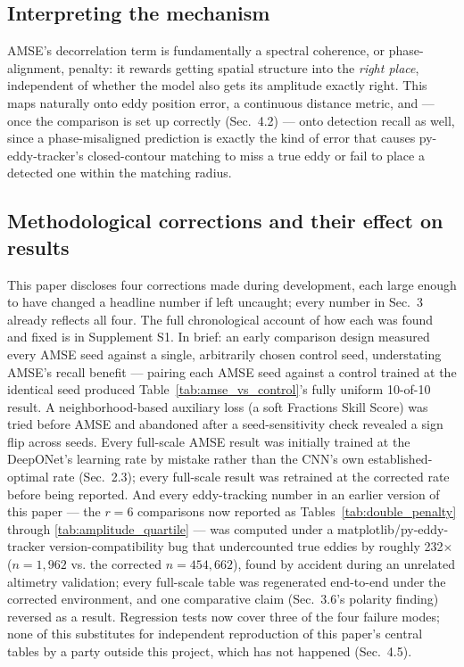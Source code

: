 \documentclass[11pt]{article}
\begin{document}
\subsection{Interpreting the mechanism}

AMSE's decorrelation term is fundamentally a spectral coherence, or phase-alignment, penalty: it rewards getting spatial structure into the \textit{right place}, independent of whether the model also gets its amplitude exactly right. This maps naturally onto eddy position error, a continuous distance metric, and --- once the comparison is set up correctly (Sec.~4.2) --- onto detection recall as well, since a phase-misaligned prediction is exactly the kind of error that causes py-eddy-tracker's closed-contour matching to miss a true eddy or fail to place a detected one within the matching radius.

\subsection{Methodological corrections and their effect on results}

This paper discloses four corrections made during development, each large enough to have changed a headline number if left uncaught; every number in Sec.~3 already reflects all four. The full chronological account of how each was found and fixed is in Supplement S1. In brief: an early comparison design measured every AMSE seed against a single, arbitrarily chosen control seed, understating AMSE's recall benefit --- pairing each AMSE seed against a control trained at the identical seed produced Table~\ref{tab:amse_vs_control}'s fully uniform 10-of-10 result. A neighborhood-based auxiliary loss (a soft Fractions Skill Score) was tried before AMSE and abandoned after a seed-sensitivity check revealed a sign flip across seeds. Every full-scale AMSE result was initially trained at the DeepONet's learning rate by mistake rather than the CNN's own established-optimal rate (Sec.~2.3); every full-scale result was retrained at the corrected rate before being reported. And every eddy-tracking number in an earlier version of this paper --- the $r=6$ comparisons now reported as Tables~\ref{tab:double_penalty} through \ref{tab:amplitude_quartile} --- was computed under a matplotlib/py-eddy-tracker version-compatibility bug that undercounted true eddies by roughly 232$\times$ ($n=1{,}962$ vs. the corrected $n=454{,}662$), found by accident during an unrelated altimetry validation; every full-scale table was regenerated end-to-end under the corrected environment, and one comparative claim (Sec.~3.6's polarity finding) reversed as a result. Regression tests now cover three of the four failure modes; none of this substitutes for independent reproduction of this paper's central tables by a party outside this project, which has not happened (Sec.~4.5).
\end{document}
